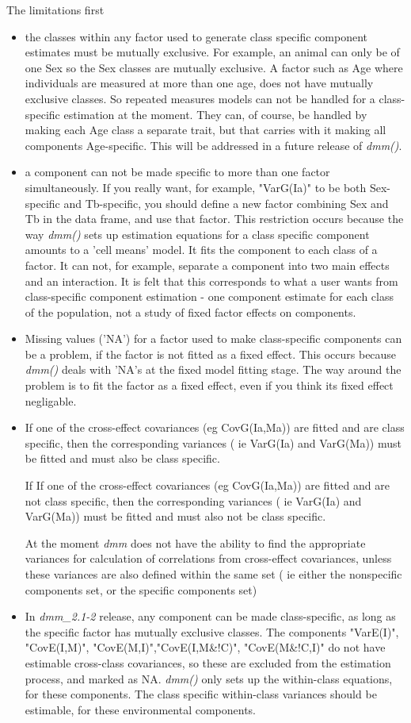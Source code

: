 \documentclass[titlepage]{article}  %
\begin{document}
The limitations first
\begin{itemize}
\item the classes within any factor used to generate class specific component estimates must be mutually exclusive. For example, an animal can only be of one Sex so the Sex classes are mutually exclusive. A factor such as Age where individuals are measured at more than one age, does not have mutually exclusive classes. So repeated measures models can not be handled for a class-specific estimation at the moment. They can, of course, be handled by making each Age class a separate trait, but that carries with it making all components Age-specific.
This will be addressed in a future release of {\em dmm()}.
\item a component can not be made specific to more than one factor simultaneously. If you really want, for example, "VarG(Ia)" to be both Sex-specific and Tb-specific, you should define a new factor combining Sex and Tb in the data frame, and use that factor. This restriction occurs because the way {\em dmm()} sets up estimation equations for a class specific component amounts to a 'cell means' model. It fits the component to each class of a factor. It can not, for example, separate a component into two main effects and an interaction. It is felt that this corresponds to what a user wants from class-specific component estimation - one component estimate for each class of the population, not a study of fixed factor effects on components.
\item Missing values ('NA') for a factor used to make class-specific components can be a problem, if the factor is not fitted as a fixed effect. This occurs because {\em dmm()} deals with 'NA's at the fixed model fitting stage. The way around the problem is to fit the factor as a fixed effect, even if you think its fixed effect negligable.
\item If one of the cross-effect covariances (eg CovG(Ia,Ma)) are fitted and are class specific, then the corresponding variances ( ie VarG(Ia) and VarG(Ma)) must be fitted and must also be class specific. 

 If If one of the cross-effect covariances (eg CovG(Ia,Ma)) are fitted and are not class specific, then the corresponding variances ( ie VarG(Ia) and VarG(Ma)) must be fitted and must also not be class specific.

 At the moment {\em dmm} does not have the ability to find the appropriate variances for calculation of correlations from cross-effect covariances, unless these variances are also defined within the same set ( ie either the nonspecific components set, or the specific components set)
\item In {\em dmm\_2.1-2} release, any component can be made class-specific, as long as the specific factor has mutually exclusive classes. The components "VarE(I)",  "CovE(I,M)", "CovE(M,I)","CovE(I,M\&!C)", "CovE(M\&!C,I)" do not have estimable cross-class covariances, so these are excluded from the estimation process, and marked as NA.  {\em dmm()} only sets up  the within-class equations, for these components. The class specific within-class variances should be estimable, for these environmental components.


\end{itemize}
\end{document}

